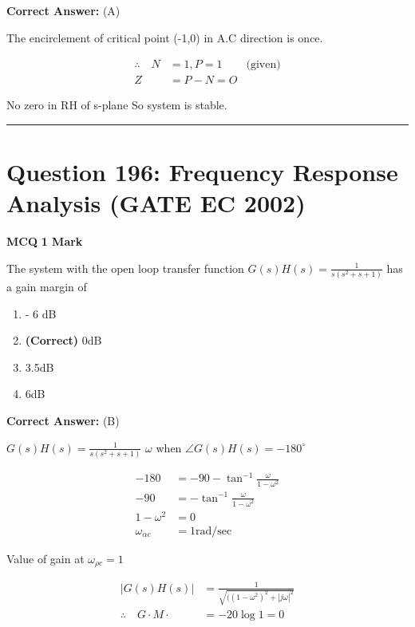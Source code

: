 \documentclass[11pt,a4paper]{article}
\begin{document}
\noindent \textbf{Correct Answer:} (A)

\begin{tcolorbox}[solbox, title=Detailed Solution -- Question 195]
The encirclement of critical point (-1,0) in A.C
direction is once.

\[
\begin{aligned}
\therefore   \quad N&=1, P=1 &\text{(given)}\\
Z&=P-N=O
\end{aligned}
\]

No zero in RH of s-plane So system is stable.
\end{tcolorbox}

\vspace{1.5em}
\hrule
\vspace{1.5em}

\section*{Question 196: Frequency Response Analysis (GATE EC 2002)}
\noindent \textbf{\color{primary}MCQ} \hfill \textbf{\color{secondary}1 Mark}


\noindent The system with the open loop transfer function $G(s)H(s)=\frac{1}{s(s^{2}+s+1)}$ has a gain margin of


\begin{enumerate}[label=(\Alph*)]
    \item - 6 dB
    \item \textbf{(Correct)} 0dB
    \item 3.5dB
    \item 6dB
\end{enumerate}

\noindent \textbf{Correct Answer:} (B)

\begin{tcolorbox}[solbox, title=Detailed Solution -- Question 196]
$G(s) H(s)=\frac{1}{s\left(s^{2}+s+1\right)}$
$\omega$ when $\angle G(s) H(s)=-180^{\circ}$

\[
\begin{aligned} -180 &=-90-\tan ^{-1} \frac{\omega}{1-\omega^{2}} \\ -90 &=-\tan ^{-1} \frac{\omega}{1-\omega^{2}} \\ 1-\omega^{2} &=0 \\ \omega_{\alpha c} &=1 \mathrm{rad} / \mathrm{sec} \end{aligned}
\]

 Value of gain at $\omega_{\rho c}=1$

\[
\begin{aligned} |G(s) H(s)| &=\frac{1}{\sqrt{((1-\omega^{2})^{2}+|j \omega|^{2}}} \\ \therefore \quad G \cdot M \cdot &=-20 \log 1=0 \end{aligned}
\]
\end{tcolorbox}
\end{document}
